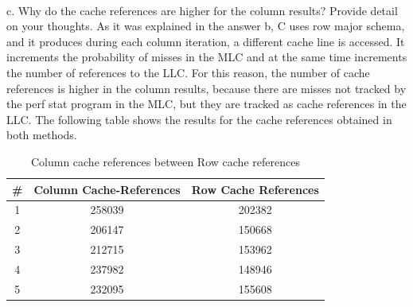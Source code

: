 \documentclass[xcolor=table]{llncs}
\begin{document}
\paragraph{}
c. Why do the cache references are higher for the column results? Provide detail on your thoughts.\newline
As it was explained in the answer b, C uses row major schema, and it produces during each column iteration, a different cache line is accessed. It increments the probability of misses in the MLC and at the same time increments the number of references to the LLC. 
For this reason, the number of cache references is higher in the column results, because there are misses not tracked by the perf stat program in the MLC, but they are tracked as cache references in the LLC.
The following table shows the results for the cache references obtained in both methods. 
\begin{table}[]
\centering
\caption{Column cache references between Row cache references}
\label{table5}
\begin{tabular}{ccc}
\hline
\rowcolor[HTML]{000000} 
{\color[HTML]{FFFFFF} \textbf{\#}} & {\color[HTML]{FFFFFF} \textbf{Column Cache-References}} & {\color[HTML]{FFFFFF} \textbf{Row Cache References}} \\ \hline
1 & 258039 & 202382 \\
2 & 206147 & 150668 \\
3 & 212715 & 153962 \\
4 & 237982 & 148946 \\
5 & 232095 & 155608 \\ \hline
\end{tabular}
\end{table}
\newline
\newline
\end{document}
